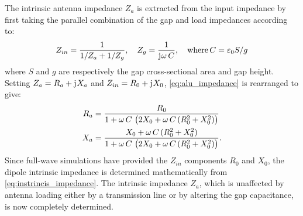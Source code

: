 \documentclass[11pt]{article}
\begin{document}
The intrinsic antenna impedance $Z_a$ is extracted from the input impedance by first taking the parallel combination of the gap and load impedances according to:
%
\begin{equation}
  Z_{in} = \frac{1}{1 / Z_a + 1 / Z_g}, \quad  Z_g = \frac{1}{\mathrm{j}\mkern1mu \omega \,C}, \quad \text{where} \,C = \varepsilon_0 S/g
  \label{eq:alu_impedance}
\end{equation}
%
where $S$ and $g$ are respectively the gap cross-sectional area and gap height. Setting $Z_a = R_a + \mathrm{j}\mkern1mu X_a$ and $Z_{in} = R_0 + \mathrm{j}\mkern1mu X_0$,  \eqref{eq:alu_impedance} is rearranged to give:
%
\begin{subequations}
  \begin{align}
    R_a ={}& \frac{R_0}{1 + \omega \, C \,\left( 2 X_0 + \omega \,C \,(R_0^2 + X_0^2) \right)}
    \label{eq:intrinsic_resistance}\\
    X_a ={}& \frac{X_0 + \omega \, C \,(R_0^2 + X_0^2)} {1 + \omega \, C \,\left( 2 X_0 + \omega \, C \,(R_0^2 + X_0^2) \right)}.
    \label{eq:intrinsic_admittance}
  \end{align}
  \label{eq:instrincis_impedance}%
\end{subequations}
%
Since full-wave simulations have provided the $Z_{in}$ components $R_0$ and $X_0$, the dipole intrinsic impedance is determined mathematically from \eqref{eq:instrincis_impedance}. The intrinsic impedance $Z_a$, which is unaffected by antenna loading either by a transmission line or by altering the gap capacitance, is now completely determined.
\end{document}
